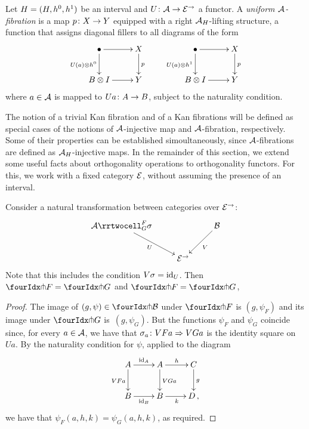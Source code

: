 \documentclass[reqno,10pt,a4paper,oneside]{amsart}
\begin{document}
\begin{definition} \label{A-fibration} Let  $\interval = (\interval, \intervall, \intervalr)$ be an interval and
 $U \co \cal{A} \to \catE^\to$ a functor.
A \emph{uniform $\cal{A}$-fibration} is a map $p \co X \to Y$ equipped with a right $\cal{A}_\interval$-lifting structure, \ie a function that assigns diagonal fillers to all diagrams of the form
\[
\xymatrix{
\bullet \ar[r] \ar[d]_{U(a) \otimes \intervall} & X \ar[d]^p \\
B \otimes I \ar[r] & Y} \qquad \xymatrix{
\bullet \ar[r] \ar[d]_{U(a) \otimes \intervalr} & X \ar[d]^p \\
B \otimes I \ar[r] & Y}
\]
where $a \in \cal{A}$ is mapped to $Ua \co A \to B$, subject to the naturality condition.
\end{definition}

The notion of a trivial Kan fibration and of a Kan fibrations will be defined as special cases of the notions of
$\cal{A}$-injective map and $\cal{A}$-fibration, respectively. Some of their properties can be established 
simoultaneously, since $\cal{A}$-fibrations are defined as  $\cal{A}_\interval$-injective maps.
In the remainder of this section, we extend some useful facts about orthogonality operations to orthogonality functors. For this, we work with a fixed category $\catE$, without assuming the presence of an interval. 


\begin{proposition}
Consider a natural transformation between categories over $\catE^{\to}$:
\[
\xymatrix{
  \cal{A}
  \rrtwocell_G^F{\sigma}
 \ar[dr]_{U}
&&
  \cal{B}
  \ar[dl]^{V}
\\&
  \catE^{\to}
}
\]
Note that this includes the condition $V \sigma = \id_U$.
Then $\liftr{F} = \liftr{G}$ and $\liftl{F} = \liftl{G}$, 
\end{proposition}

\begin{proof} The image of $(g, \psi) \in \liftr{\cal{B}}$ under $\liftr{F}$ is $(g, \psi_F)$ and its
image under $\liftr{G}$ is~$(g, \psi_G)$. But the functions $\psi_F$ and $\psi_G$ coincide since, for
every $a \in \cal{A}$, we have that $\sigma_a \co VFa \Rightarrow VGa$ is the identity square on $Ua$. 
By the naturality condition for $\psi$, applied to the diagram 
\[
\xymatrix{
A \ar[r]^{\id_A} \ar[d]_{VFa}  & A \ar[d]^{VGa} \ar[r]^{h}  & C \ar[d]^g \\
B \ar[r]_{\id_B} & B \ar[r]_{k} & D \, ,}
\]
we have  that $\psi_F(a, h, k) = \psi_G(a, h, k)$, as required.
\end{proof} 
\end{document}
